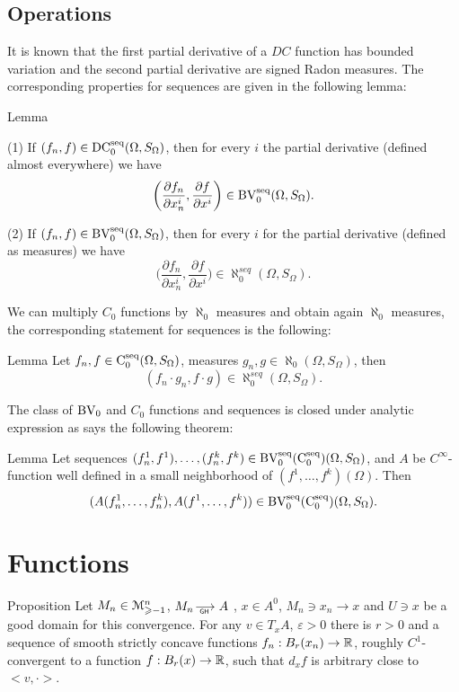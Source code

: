 \subsection{Operations}

It is known that
the first partial derivative of a $DC$ function has bounded variation
and the second partial derivative are signed Radon measures.
The corresponding properties for sequences are given in the following lemma:

\begin{thm}{Lemma}\label{thm-D}

(1) If $( f_n, f)\in\operatorname{DC_0^{seq}}(\Omega,S_\Omega)$,
then for every $i$ the partial derivative (defined almost everywhere)
we have
$$\biggl(\frac{\partial f_n}{\partial x_n^i}, \frac{\partial f}{\partial x^i}\biggr)\in\operatorname{BV_0^{seq}}(\Omega,S_\Omega).$$

(2) 
 If     $( f_n, f)\in\operatorname{BV_0^{seq}}(\Omega,S_\Omega)$, 
then for every $i$ for the partial derivative (defined as measures)
we have
$$\biggl(\frac{\partial f_n}{\partial x_n^i}, \frac{\partial f}{\partial x^i}\biggr)\in\aleph_0^{seq}(\Omega,S_\Omega).$$

\end{thm}

We can  multiply $C_0$ functions by $\aleph_0$ measures and
obtain again $\aleph_0$ measures, the corresponding statement
for sequences is the following:

\begin{thm}{Lemma}\label{thm-CM}
Let $f_n, f\in\operatorname{C_0^{seq}}(\Omega,S_\Omega)$,
measures $g_n, g\in\aleph_0(\Omega,S_\Omega)$,
then
$$(f_n\cdot g_n,f\cdot g)\in\aleph_0^{seq}(\Omega,S_\Omega).$$
\end{thm}

The class of $\operatorname{BV_0}$ and $C_0$ functions and sequences is closed under analytic expression as
says the following theorem:
\begin{thm}{Lemma}\label{thm-A}
Let sequences $(f^1_n,f^1),\dots,(f^k_n, f^k) \in \operatorname{BV_0^{seq}(C_0^{seq})}(\Omega,S_\Omega)$,
and $A$ be  $C^\infty$-function well defined in a small neighborhood of
$(f^1,\dots,f^k)(\Omega)$.
Then $$(A(f^1_n,\dots,f^k_n), A(f^1,\dots,f^k))\in\operatorname{BV_0^{seq}(C_0^{seq})}(\Omega,S_\Omega).$$
\end{thm}


\section{ Functions }
 \begin{thm}{Proposition}\label{NiceFunctions}
 Let   
	$M_n\in\mathcal M_{\geqslant -1}^n$,
	$M_n\GHto A$ , $ x\in A^0$, $M_n\ni x_n\to x$
	and $U\ni x$
	be a good domain for this convergence.
 For any
  $v\in T_xA$,
 $\varepsilon>0$
 there is  $r>0$
 and a
  sequence of smooth strictly concave functions
 $f_n: B_r(x_n)\to \mathbb{R}$, roughly $C^1$-convergent to a function 
 $ f:B_r(x)\to\mathbb{R}$,
such that $d_xf$  is arbitrary close to $ <v,\cdot>$.
 \end{thm}
  
